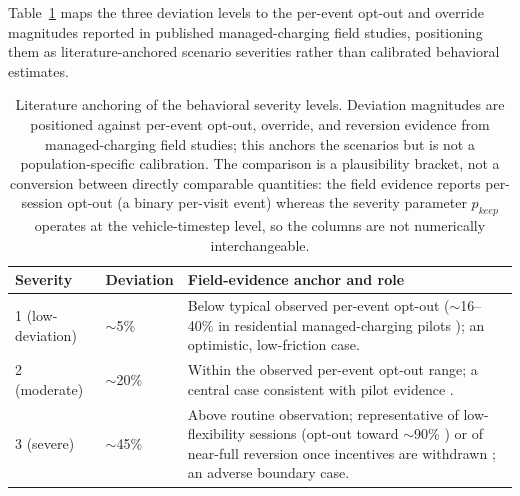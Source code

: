 \documentclass[12pt]{article}
\begin{document}
Table~\ref{tab:sevanchor} maps the three deviation levels to the per-event opt-out and override magnitudes reported in published managed-charging field studies, positioning them as literature-anchored scenario severities rather than calibrated behavioral estimates.

\begin{table}[t]
\centering
\caption{Literature anchoring of the behavioral severity levels. Deviation magnitudes are positioned against per-event opt-out, override, and reversion evidence from managed-charging field studies; this anchors the scenarios but is not a population-specific calibration. The comparison is a plausibility bracket, not a conversion between directly comparable quantities: the field evidence reports per-session opt-out (a binary per-visit event) whereas the severity parameter $p_{keep}$ operates at the vehicle-timestep level, so the columns are not numerically interchangeable.}
\label{tab:sevanchor}
\begin{tabularx}{\textwidth}{p{}p{}X}
\hline
Severity & Deviation & Field-evidence anchor and role \\
\hline
1 (low-deviation) & $\sim$5\% & Below typical observed per-event opt-out ($\sim$16--40\% in residential managed-charging pilots \cite{alexeenko2023pilot,dudek2021electricnation}); an optimistic, low-friction case. \\
2 (moderate) & $\sim$20\% & Within the observed per-event opt-out range; a central case consistent with pilot evidence \cite{alexeenko2023pilot}. \\
3 (severe) & $\sim$45\% & Above routine observation; representative of low-flexibility sessions (opt-out toward $\sim$90\% \cite{alexeenko2023pilot}) or of near-full reversion once incentives are withdrawn \cite{bailey2025fieldexp}; an adverse boundary case. \\
\hline
\end{tabularx}
\end{table}
\end{document}
